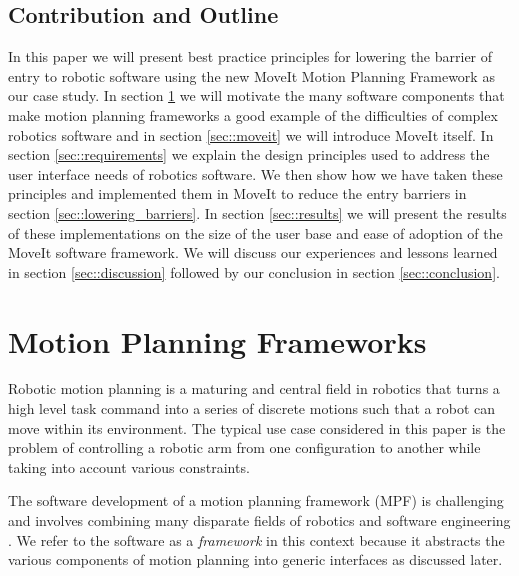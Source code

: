 \documentclass[10pt,journal,compsoc]{joser1}
\begin{document}
{%
\subsection{Contribution and Outline}

In this paper we will present best practice principles for lowering the barrier of entry to robotic software using the new MoveIt Motion Planning Framework as our case study. In section \ref{sec::motion_planning} we will motivate the many software components that make motion planning frameworks a good example of the difficulties of complex robotics software and in section \ref{sec::moveit} we will introduce MoveIt itself. In section \ref{sec::requirements} we explain the design principles used to address the user interface needs of robotics software. We then show how we have taken these principles and implemented them in MoveIt to reduce the entry barriers in section \ref{sec::lowering_barriers}. In section \ref{sec::results} we will present the results of these implementations on the size of the user base and ease of adoption of the MoveIt software framework. We will discuss our experiences and lessons learned in section \ref{sec::discussion} followed by our conclusion in section \ref{sec::conclusion}.

\section{Motion Planning Frameworks}
\label{sec::motion_planning}

Robotic motion planning is a maturing and central field in robotics \cite{moll2011teaching} that turns a high level task command into a series of discrete motions such that a robot can move within its environment. The typical use case considered in this paper is the problem of controlling a robotic arm from one configuration to another while taking into account various constraints.

The software development of a motion planning framework (MPF) is challenging and involves combining many disparate fields of robotics and software engineering \cite{perez2010roadmap}. We refer to the software as a \textit{framework} in this context because it abstracts the various components of motion planning into generic interfaces as discussed later.

}
\end{document}
